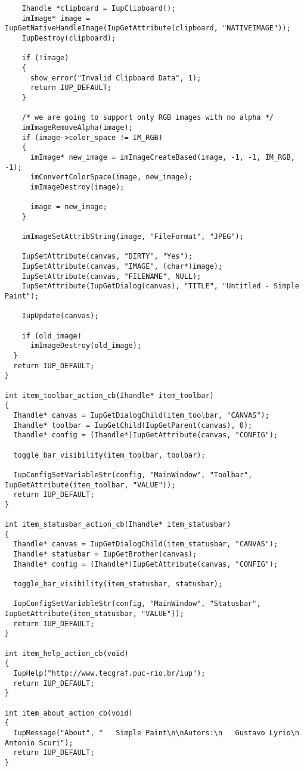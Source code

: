 \documentclass{ctexart}
\begin{document}
\begin{lstlisting}
    Ihandle *clipboard = IupClipboard();
    imImage* image = IupGetNativeHandleImage(IupGetAttribute(clipboard, "NATIVEIMAGE"));
    IupDestroy(clipboard);

    if (!image)
    {
      show_error("Invalid Clipboard Data", 1);
      return IUP_DEFAULT;
    }

    /* we are going to support only RGB images with no alpha */
    imImageRemoveAlpha(image);
    if (image->color_space != IM_RGB)
    {
      imImage* new_image = imImageCreateBased(image, -1, -1, IM_RGB, -1);
      imConvertColorSpace(image, new_image);
      imImageDestroy(image);

      image = new_image;
    }

    imImageSetAttribString(image, "FileFormat", "JPEG");

    IupSetAttribute(canvas, "DIRTY", "Yes");
    IupSetAttribute(canvas, "IMAGE", (char*)image);
    IupSetAttribute(canvas, "FILENAME", NULL);
    IupSetAttribute(IupGetDialog(canvas), "TITLE", "Untitled - Simple Paint");

    IupUpdate(canvas);

    if (old_image)
      imImageDestroy(old_image);
  }
  return IUP_DEFAULT;
}

int item_toolbar_action_cb(Ihandle* item_toolbar)
{
  Ihandle* canvas = IupGetDialogChild(item_toolbar, "CANVAS");
  Ihandle* toolbar = IupGetChild(IupGetParent(canvas), 0);
  Ihandle* config = (Ihandle*)IupGetAttribute(canvas, "CONFIG");

  toggle_bar_visibility(item_toolbar, toolbar);

  IupConfigSetVariableStr(config, "MainWindow", "Toolbar", IupGetAttribute(item_toolbar, "VALUE"));
  return IUP_DEFAULT;
}

int item_statusbar_action_cb(Ihandle* item_statusbar)
{
  Ihandle* canvas = IupGetDialogChild(item_statusbar, "CANVAS");
  Ihandle* statusbar = IupGetBrother(canvas);
  Ihandle* config = (Ihandle*)IupGetAttribute(canvas, "CONFIG");

  toggle_bar_visibility(item_statusbar, statusbar);

  IupConfigSetVariableStr(config, "MainWindow", "Statusbar", IupGetAttribute(item_statusbar, "VALUE"));
  return IUP_DEFAULT;
}

int item_help_action_cb(void)
{
  IupHelp("http://www.tecgraf.puc-rio.br/iup");
  return IUP_DEFAULT;
}

int item_about_action_cb(void)
{
  IupMessage("About", "   Simple Paint\n\nAutors:\n   Gustavo Lyrio\n   Antonio Scuri");
  return IUP_DEFAULT;
}



\end{lstlisting}
\end{document}

